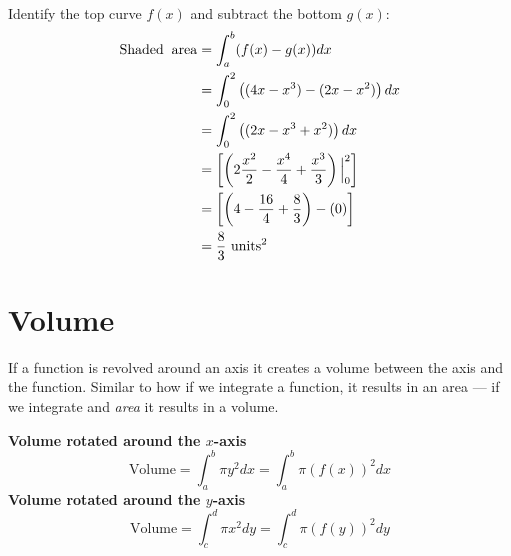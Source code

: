 \begin{multicols}{2}
	\columnbreak
\\	\solution Identify the top curve $f(x)$ and subtract the bottom $g(x)$:
	\begin{align*}
	\mathrm{Shaded \hspace{0.2cm}area}&=\int_{a}^{b}(f(x)-g(x))dx\\
	&=\int_{0}^{2}\left((4x-x^3)-(2x-x^2)\right)dx\\
	&=\int_{0}^{2}\left((2x-x^3+x^2)\right)dx\\
	&=\left[\left(2\frac{x^2}{2}-\frac{x^4}{4}+\frac{x^3}{3} \right)\Big|_{0}^2\right]\\
	&=\left[\left(4-\frac{16}{4}+\frac{8}{3}\right)-(0)\right]\\
	&=\frac{8}{3} \,\, \mathrm{units}^2
	\end{align*}
\end{multicols}

\section{Volume}
If a function is revolved around an axis it creates a volume between the axis and the function. Similar to how if we integrate a function, it results in an area --- if we integrate and \textit{area} it results in a volume.

\begin{tcolorbox}
\textbf{Volume rotated around the $x$-axis}
\[ \text{Volume} = \int_{a}^{b} \pi y^2 dx = \int_{a}^{b} \pi (f(x))^2 dx\]
\textbf{Volume rotated around the $y$-axis}
\[ \text{Volume} = \int_{c}^{d} \pi x^2 dy =\int_{c}^{d} \pi (f(y))^2 dy  \]
\end{tcolorbox}


